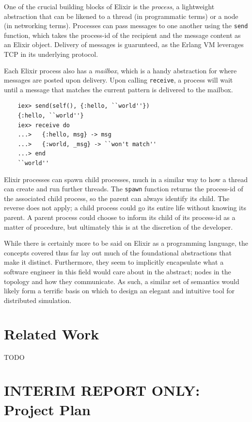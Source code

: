 One of the crucial building blocks of Elixir is the \emph{process}, a lightweight abstraction that can be likened to
a thread (in programmatic terms) or a node (in networking terms)\cite{elixir_processes}. Processes can pass messages
to one another using the \texttt{send} function, which takes the process-id of the recipient and the message content as
an Elixir object. Delivery of messages is guarunteed, as the Erlang VM leverages TCP in its underlying
protocol\cite{erlang_protocol}.

Each Elixir process also has a \emph{mailbox}, which is a handy abstraction for where messages are posted upon
delivery. Upon calling \texttt{receive}, a process will wait until a message that matches the current pattern is
delivered to the mailbox.

\begin{lstlisting}
    iex> send(self(), {:hello, ``world''})
    {:hello, ``world''}
    iex> receive do
    ...>   {:hello, msg} -> msg
    ...>   {:world, _msg} -> ``won't match''
    ...> end
    ``world''
\end{lstlisting}

Elixir processes can spawn child processes, much in a similar way to how a thread can create and run further threads.
The \texttt{spawn} function returns the process-id of the associated child process, so the parent can always identify
its child. The reverse does not apply; a child process could go its entire life without knowing its parent. A parent
process could choose to inform its child of its process-id as a matter of procedure, but ultimately this is at the
discretion of the developer.

While there is certainly more to be said on Elixir as a programming language, the concepts covered thus far lay out
much of the foundational abstractions that make it distinct. Furthermore, they seem to implicitly encapsulate what a
software engineer in this field would care about in the abstract; nodes in the topology and how they communicate.
As such, a similar set of semantics would likely form a terrific basis on which to design an elegant and intuitive
tool for distributed simulation.


\section{Related Work}

TODO

\newpage


\section{INTERIM REPORT ONLY: Project Plan}

